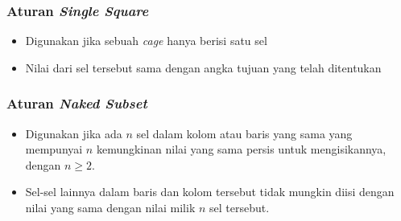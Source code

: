 \documentclass{beamer}
\begin{document}
\begin{frame}
\frametitle{Aturan \textit{Single Square}}
\begin{itemize}
\item Digunakan jika sebuah \textit{cage} hanya berisi satu sel
\item Nilai dari sel tersebut sama dengan angka tujuan yang telah ditentukan
\end{itemize}
\end{frame}


\begin{frame}
\frametitle{Aturan \textit{Naked Subset}}
\begin{itemize}
\item Digunakan jika ada \begin{math}n\end{math} sel dalam kolom atau baris yang sama yang mempunyai \begin{math}n\end{math} kemungkinan nilai yang sama persis untuk mengisikannya, dengan \begin{math}n \geq 2 \end{math}.
\item Sel-sel lainnya dalam baris dan kolom tersebut tidak mungkin diisi dengan nilai yang sama dengan nilai milik \begin{math}n\end{math} sel tersebut. 
\end{itemize}
\end{frame}

\end{document}
